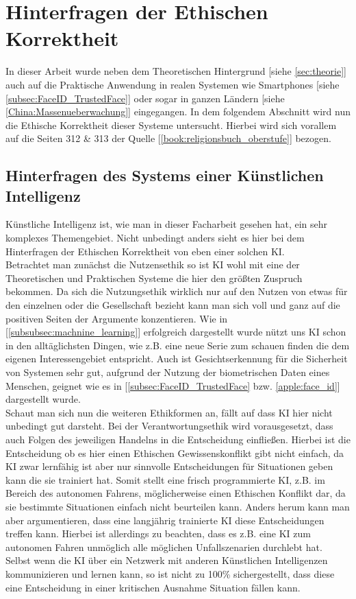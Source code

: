 \section{Hinterfragen der Ethischen Korrektheit}
    In dieser Arbeit wurde neben dem Theoretischen Hintergrund [siehe \ref{sec:theorie}] auch auf die Praktische Anwendung in realen Systemen wie Smartphones [siehe \ref{subsec:FaceID_TrustedFace}] oder sogar in ganzen Ländern [siehe \ref{China:Massenueberwachung}] eingegangen. In dem folgendem Abschnitt wird nun die Ethische Korrektheit dieser Systeme untersucht. Hierbei wird sich vorallem auf die Seiten 312 & 313 der Quelle [\ref{book:religionsbuch_oberstufe}] bezogen.

    \subsection{Hinterfragen des Systems einer Künstlichen Intelligenz}
    \label{subsec:ethik_ki}
        Künstliche Intelligenz ist, wie man in dieser Facharbeit gesehen hat, ein sehr komplexes Themengebiet. Nicht unbedingt anders sieht es hier bei dem Hinterfragen der Ethischen Korrektheit von eben einer solchen KI.\\

        Betrachtet man zunächst die Nutzensethik so ist KI wohl mit eine der Theoretischen und Praktischen Systeme die hier den größten Zuspruch bekommen. Da sich die Nutzungsethik wirklich nur auf den Nutzen von etwas für den einzelnen oder die Gesellschaft bezieht kann man sich voll und ganz auf die positiven Seiten der Argumente konzentieren. Wie in [\ref{subsubsec:machnine_learning}] erfolgreich dargestellt wurde nützt uns KI schon in den alltäglichsten Dingen, wie z.B. eine neue Serie zum schauen finden die dem eigenen Interessengebiet entspricht. Auch ist Gesichtserkennung für die Sicherheit von Systemen sehr gut, aufgrund der Nutzung der biometrischen Daten eines Menschen, geignet wie es in [\ref{subsec:FaceID_TrustedFace} bzw. \ref{apple:face_id}] dargestellt wurde.\\

        Schaut man sich nun die weiteren Ethikformen an, fällt auf dass KI hier nicht unbedingt gut darsteht. Bei der Verantwortungsethik wird vorausgesetzt, dass auch Folgen des jeweiligen Handelns in die Entscheidung einfließen. Hierbei ist die Entscheidung ob es hier einen Ethischen Gewissenskonflikt gibt nicht einfach, da KI zwar lernfähig ist aber nur sinnvolle Entscheidungen für Situationen geben kann die sie trainiert hat. Somit stellt eine frisch programmierte KI, z.B. im Bereich des autonomen Fahrens, möglicherweise einen Ethischen Konflikt dar, da sie bestimmte Situationen einfach nicht beurteilen kann. Anders herum kann man aber argumentieren, dass eine langjährig trainierte KI diese Entscheidungen treffen kann. Hierbei ist allerdings zu beachten, dass es z.B. eine KI zum autonomen Fahren unmöglich alle möglichen Unfallszenarien durchlebt hat. Selbst wenn die KI über ein Netzwerk mit anderen Künstlichen Intelligenzen kommunizieren und lernen kann, so ist nicht zu 100\% sichergestellt, dass diese eine Entscheidung in einer kritischen Ausnahme Situation fällen kann. 
        
